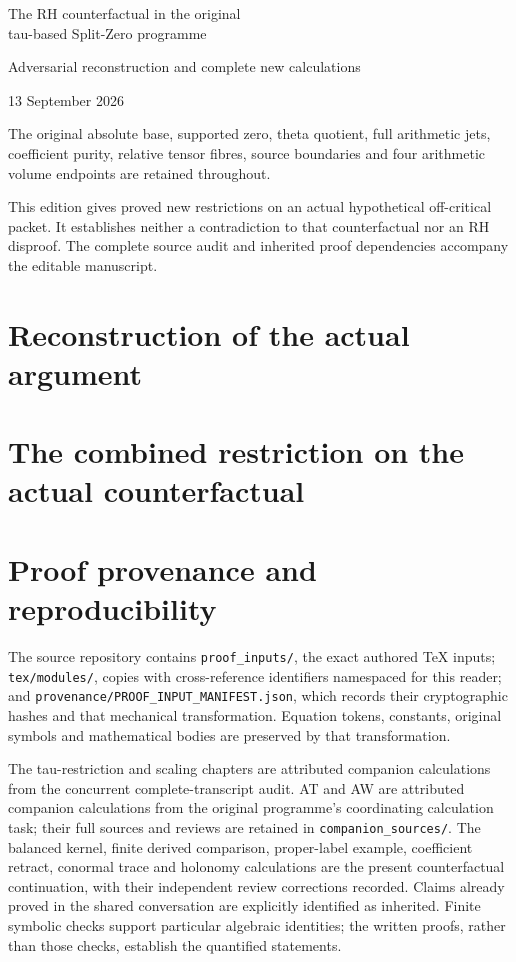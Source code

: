 \documentclass[11pt,a4paper,oneside,openany]{book}
\theoremstyle{definition}
\begin{document}
\frontmatter
\begin{titlepage}
\vspace*{24mm}
{\sffamily\LARGE The RH counterfactual in the original\\[5pt]
tau-based Split-Zero programme\par}
\vspace{12mm}
{\Large Adversarial reconstruction and complete new calculations\par}
\vspace{10mm}
{\large 13 September 2026\par}
\vfill
The original absolute base, supported zero, theta quotient, full arithmetic
jets, coefficient purity, relative tensor fibres, source boundaries and
four arithmetic volume endpoints are retained throughout.

This edition gives proved new restrictions on an actual hypothetical
off-critical packet. It establishes neither a contradiction to that
counterfactual nor an RH disproof. The complete source audit and inherited
proof dependencies accompany the editable manuscript.
\end{titlepage}
\tableofcontents
\mainmatter
\chapter{Reconstruction of the actual argument}


\chapter{The combined restriction on the actual counterfactual}

\chapter{Proof provenance and reproducibility}
The source repository contains \texttt{proof\_inputs/}, the exact authored
TeX inputs; \texttt{tex/modules/}, copies with cross-reference identifiers
namespaced for this reader; and \nolinkurl{provenance/PROOF_INPUT_MANIFEST.json},
which records their cryptographic hashes and that mechanical transformation.
Equation tokens, constants, original symbols and mathematical bodies are
preserved by that transformation.

The tau-restriction and scaling chapters are attributed companion
calculations from the concurrent complete-transcript audit. AT and AW
are attributed companion calculations from the original programme's
coordinating calculation task; their full sources and reviews are retained
in \texttt{companion\_sources/}. The balanced
kernel, finite derived comparison, proper-label example, coefficient
retract, conormal trace and holonomy calculations are the present
counterfactual continuation, with their independent review corrections
recorded. Claims already proved in the shared conversation are explicitly
identified as inherited. Finite symbolic checks support particular
algebraic identities; the written proofs, rather than those checks,
establish the quantified statements.
\end{document}
